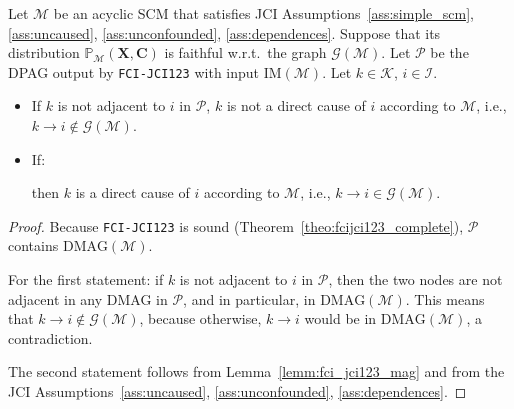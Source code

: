 \documentclass[twoside,11pt]{article}
\newcommand{\Prb}{\mathbb{P}}
\newcommand\B[1]{\bm{#1}}
\newcommand\C[1]{\mathcal{#1}}
\newcommand{\ctc}{\,\circ\mkern-9mu\relbar\mkern-9mu\circ\,}
\newcommand{\cto}{\,\circ\mkern-9mu\rightarrow}
\newcommand{\DMAG}{\mathrm{DMAG}}
\newcommand{\IM}{\mathrm{IM}}
\newcommand{\alg}[1]{\texttt{#1}}
\newcommand{\Joris}[1]{{\color{blue}#1}}
\newcommand{\JCIABC}{\ref{ass:uncaused}, \ref{ass:unconfounded}, \ref{ass:dependences}}
\begin{document}
\begin{proposition}
Let $\C{M}$ be an acyclic SCM that satisfies JCI Assumptions~\ref{ass:simple_scm}, \JCIABC.
Suppose that its distribution $\Prb_{\C{M}}(\B{X},\B{C})$ is faithful w.r.t.\ the graph $\C{G}(\C{M})$. 
Let $\C{P}$ be the DPAG output by \alg{FCI-JCI123} with input $\IM(\C{M})$.
Let $k \in \C{K}$, $i \in \C{I}$. 
  \begin{itemize}
    \item If $k$ is not adjacent to $i$ in $\C{P}$, $k$ is not a direct cause of $i$ according to $\C{M}$, i.e., $k \to i \not\in \C{G}(\C{M})$. 
    \item If:
    then $k$ is a direct cause of $i$ according to $\C{M}$, i.e., $k \to i \in \C{G}(\C{M})$.
  \end{itemize}
\end{proposition}
\begin{proof}
  Because \alg{FCI-JCI123} is sound (Theorem~\ref{theo:fcijci123_complete}), $\C{P}$ contains $\DMAG(\C{M})$. 

For the first statement: if $k$ is not adjacent to $i$ in $\C{P}$, then the two nodes are not adjacent in any DMAG in $\C{P}$, and in particular, in $\DMAG(\C{M})$. 
  This means that  $k \to  i \not\in \C{G}(\C{M})$, because otherwise, $k \to i$ would be in $\DMAG(\C{M})$, a contradiction.

The second statement follows from Lemma~\ref{lemm:fci_jci123_mag} and from the JCI Assumptions~\JCIABC.
\end{proof}
\end{document}
